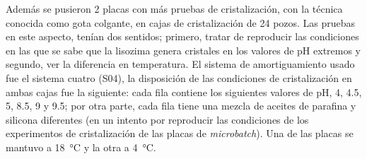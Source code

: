 \documentclass[11pt,letterpaper]{article}
\begin{document}
\begin{table}[h]
\centering
{}
\caption{Pruebas de cristalización de PF17-8. Gotas de \SI{4}{\micro\liter}.}
\label{tab:crispf178}
\end{table}

Además se pusieron 2 placas con más pruebas de cristalización, con la técnica conocida como gota colgante, en cajas de cristalización de 24 pozos. Las pruebas en este aspecto, tenían dos sentidos; primero, tratar de reproducir las condiciones en las que se sabe que la lisozima genera cristales en los valores de pH extremos y segundo, ver la diferencia en temperatura. El sistema de amortiguamiento usado fue el sistema cuatro (S04), la disposición de las condiciones de cristalización en ambas cajas fue la siguiente: cada fila contiene los siguientes valores de pH, \num{4}, \num{4.5}, \num{5}, \num{8.5}, \num{9} y \num{9.5}; por otra parte, cada fila tiene una mezcla de aceites de parafina y silicona diferentes (en un intento por reproducir las condiciones de los experimentos de cristalización de las placas de \emph{microbatch}). Una de las placas se mantuvo a \SI{18}{\degreeCelsius} y la otra a \SI{4}{\degreeCelsius}. 
\end{document}
